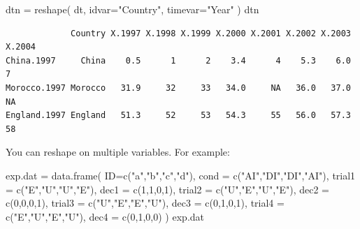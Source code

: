 \documentclass[
  letterpaper,
  DIV=11,
  numbers=noendperiod]{scrreprt}
\newenvironment{Shaded}{\begin{snugshade}}{\end{snugshade}}
\newcommand{\AttributeTok}[1]{\textcolor[rgb]{0.49,0.56,0.16}{#1}}
\newcommand{\DecValTok}[1]{\textcolor[rgb]{0.25,0.63,0.44}{#1}}
\newcommand{\FunctionTok}[1]{\textcolor[rgb]{0.02,0.16,0.49}{#1}}
\newcommand{\NormalTok}[1]{\textcolor[rgb]{0.00,0.44,0.13}{#1}}
\newcommand{\OtherTok}[1]{\textcolor[rgb]{0.00,0.44,0.13}{#1}}
\newcommand{\StringTok}[1]{\textcolor[rgb]{0.25,0.44,0.63}{#1}}
\begin{document}
\begin{Shaded}
\begin{Highlighting}[]
\NormalTok{dtn }\OtherTok{=} \FunctionTok{reshape}\NormalTok{( dt, }\AttributeTok{idvar=}\StringTok{"Country"}\NormalTok{, }\AttributeTok{timevar=}\StringTok{"Year"}\NormalTok{ )}
\NormalTok{dtn}
\end{Highlighting}
\end{Shaded}

\begin{verbatim}
             Country X.1997 X.1998 X.1999 X.2000 X.2001 X.2002 X.2003 X.2004
China.1997     China    0.5      1      2    3.4      4    5.3    6.0      7
Morocco.1997 Morocco   31.9     32     33   34.0     NA   36.0   37.0     NA
England.1997 England   51.3     52     53   54.3     55   56.0   57.3     58
\end{verbatim}

You can reshape on multiple variables. For example:

\begin{Shaded}
\begin{Highlighting}[]
\NormalTok{exp.dat }\OtherTok{=} \FunctionTok{data.frame}\NormalTok{( }\AttributeTok{ID=}\FunctionTok{c}\NormalTok{(}\StringTok{"a"}\NormalTok{,}\StringTok{"b"}\NormalTok{,}\StringTok{"c"}\NormalTok{,}\StringTok{"d"}\NormalTok{), }
      \AttributeTok{cond =} \FunctionTok{c}\NormalTok{(}\StringTok{"AI"}\NormalTok{,}\StringTok{"DI"}\NormalTok{,}\StringTok{"DI"}\NormalTok{,}\StringTok{"AI"}\NormalTok{),}
            \AttributeTok{trial1 =} \FunctionTok{c}\NormalTok{(}\StringTok{"E"}\NormalTok{,}\StringTok{"U"}\NormalTok{,}\StringTok{"U"}\NormalTok{,}\StringTok{"E"}\NormalTok{),}
            \AttributeTok{dec1 =} \FunctionTok{c}\NormalTok{(}\DecValTok{1}\NormalTok{,}\DecValTok{1}\NormalTok{,}\DecValTok{0}\NormalTok{,}\DecValTok{1}\NormalTok{),}
            \AttributeTok{trial2 =} \FunctionTok{c}\NormalTok{(}\StringTok{"U"}\NormalTok{,}\StringTok{"E"}\NormalTok{,}\StringTok{"U"}\NormalTok{,}\StringTok{"E"}\NormalTok{),}
            \AttributeTok{dec2 =} \FunctionTok{c}\NormalTok{(}\DecValTok{0}\NormalTok{,}\DecValTok{0}\NormalTok{,}\DecValTok{0}\NormalTok{,}\DecValTok{1}\NormalTok{),}
                \AttributeTok{trial3 =} \FunctionTok{c}\NormalTok{(}\StringTok{"U"}\NormalTok{,}\StringTok{"E"}\NormalTok{,}\StringTok{"E"}\NormalTok{,}\StringTok{"U"}\NormalTok{),}
            \AttributeTok{dec3 =} \FunctionTok{c}\NormalTok{(}\DecValTok{0}\NormalTok{,}\DecValTok{1}\NormalTok{,}\DecValTok{0}\NormalTok{,}\DecValTok{1}\NormalTok{),}
                \AttributeTok{trial4 =} \FunctionTok{c}\NormalTok{(}\StringTok{"E"}\NormalTok{,}\StringTok{"U"}\NormalTok{,}\StringTok{"E"}\NormalTok{,}\StringTok{"U"}\NormalTok{),}
            \AttributeTok{dec4 =} \FunctionTok{c}\NormalTok{(}\DecValTok{0}\NormalTok{,}\DecValTok{1}\NormalTok{,}\DecValTok{0}\NormalTok{,}\DecValTok{0}\NormalTok{) )}
\NormalTok{exp.dat}
\end{Highlighting}
\end{Shaded}
\end{document}
